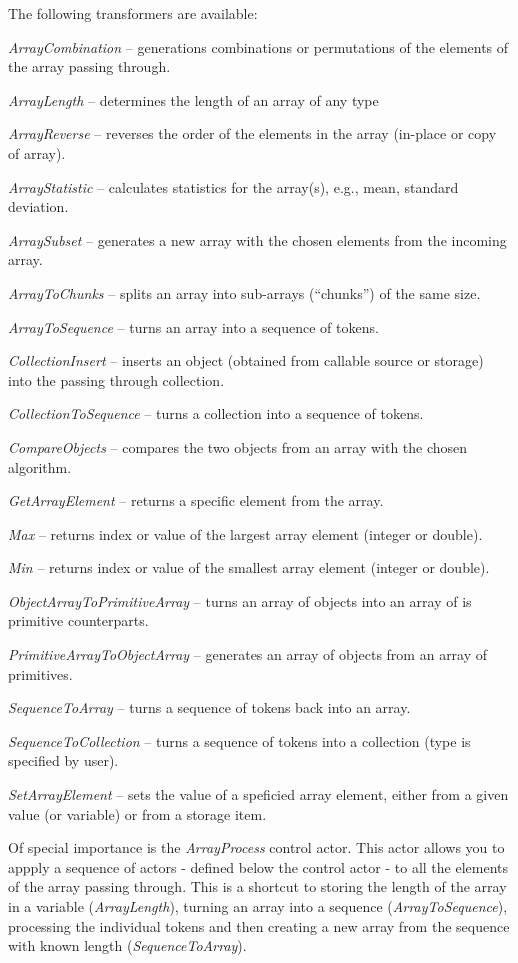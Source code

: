 \noindent The following transformers are available:
\begin{tight_itemize}
	\item \textit{ArrayCombination} -- generations combinations or permutations of
	the elements of the array passing through.
	\item \textit{ArrayLength} -- determines the length of an array of any type
	\item \textit{ArrayReverse} -- reverses the order of the elements in the array
	(in-place or copy of array).
	\item \textit{ArrayStatistic} -- calculates statistics for the array(s), e.g.,
	mean, standard deviation.
	\item \textit{ArraySubset} -- generates a new array with the chosen elements
	from the incoming array.
	\item \textit{ArrayToChunks} -- splits an array into sub-arrays (``chunks'')
	of the same size.
	\item \textit{ArrayToSequence} -- turns an array into a sequence of tokens.
	\item \textit{CollectionInsert} -- inserts an object (obtained from callable
	source or storage) into the passing through collection.
	\item \textit{CollectionToSequence} -- turns a collection into a sequence of
	tokens.
	\item \textit{CompareObjects} -- compares the two objects from an array
	with the chosen algorithm.
	\item \textit{GetArrayElement} -- returns a specific element from the array.
	\item \textit{Max} -- returns index or value of the largest array element
	(integer or double).
	\item \textit{Min} -- returns index or value of the smallest array element
	(integer or double).
	\item \textit{ObjectArrayToPrimitiveArray} -- turns an array of objects
	into an array of is primitive counterparts.
	\item \textit{PrimitiveArrayToObjectArray} -- generates an array of objects
	from an array of primitives.
	\item \textit{SequenceToArray} -- turns a sequence of tokens back into an
	array.
	\item \textit{SequenceToCollection} -- turns a sequence of tokens into a
	collection (type is specified by user).
	\item \textit{SetArrayElement} -- sets the value of a speficied array 
	element, either from a given value (or variable) or from a storage item.
\end{tight_itemize}
Of special importance is the \textit{ArrayProcess} control actor. This actor
allows you to appply a sequence of actors - defined below the control actor - to
all the elements of the array passing through. This is a shortcut to storing the
length of the array in a variable (\textit{ArrayLength}), turning an array into
a sequence (\textit{ArrayToSequence}), processing the individual tokens and then
creating a new array from the sequence with known length
(\textit{SequenceToArray}).

